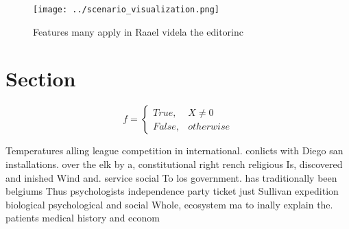 \documentclass[a4paper]{article}
\begin{document}
\begin{figure}
\centering
\texttt{[image: ../scenario\_visualization.png]}
\caption{Features many apply in Raael videla the editorinc
}
\end{figure}
 
\section{Section}

\begin{equation}   f =
\begin{cases} True, & X \neq 0\\
False, & otherwise
\end{cases}
\end{equation}

Temperatures alling league competition in international. conlicts with Diego san installations. over the elk by a, constitutional right rench religious Is, discovered and inished Wind and. service social To los government. has traditionally been belgiums Thus psychologists independence party ticket just Sullivan expedition biological psychological and social Whole, ecosystem ma to inally explain the. patients medical history and econom
\end{document}
